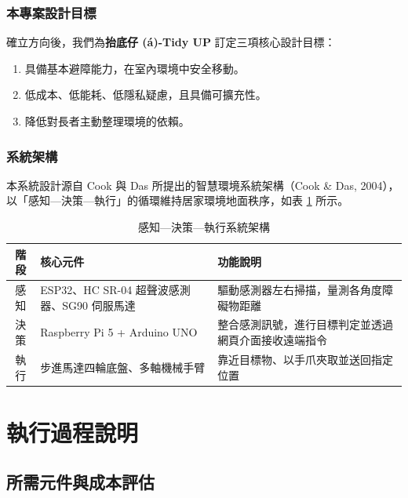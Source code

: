 \documentclass[12pt]{article}
\begin{document}
\subsubsection{本專案設計目標}

確立方向後，我們為\textbf{抬底仔 (á)-Tidy UP} 訂定三項核心設計目標：

\begin{enumerate}
  \setlength{\itemsep}{0.3em}
  \item 具備基本避障能力，在室內環境中安全移動。
  \item 低成本、低能耗、低隱私疑慮，且具備可擴充性。
  \item 降低對長者主動整理環境的依賴。
\end{enumerate}

\subsubsection{系統架構}

本系統設計源自 Cook 與 Das 所提出的智慧環境系統架構（Cook \& Das, 2004），以「感知—決策—執行」的循環維持居家環境地面秩序，如表 \ref{tab:architecture} 所示。

\begin{table}[H]
  \centering
  \caption{感知—決策—執行系統架構}
  \label{tab:architecture}
  \renewcommand{\arraystretch}{1.4}
  \begin{tabularx}{\textwidth}{c X X}
    \toprule
    \textbf{階段} & \textbf{核心元件} & \textbf{功能說明} \\
    \midrule
    感知 & ESP32、HC SR-04 超聲波感測器、SG90 伺服馬達 & 驅動感測器左右掃描，量測各角度障礙物距離 \\
    決策 & Raspberry Pi 5 + Arduino UNO & 整合感測訊號，進行目標判定並透過網頁介面接收遠端指令 \\
    執行 & 步進馬達四輪底盤、多軸機械手臂 & 靠近目標物、以手爪夾取並送回指定位置 \\
    \bottomrule
  \end{tabularx}
\end{table}

\section{執行過程說明}

\subsection{所需元件與成本評估}
\end{document}
